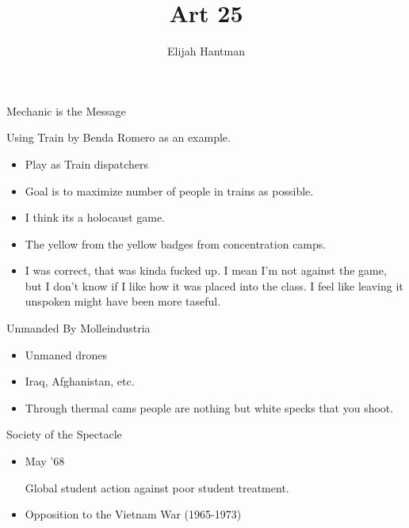 \documentclass{report}
\title{\Huge{Art 25}}
\author{\huge{Elijah Hantman}}
\date{}
\begin{document}
\maketitle
\newpage

\begin{description}
    \item {\large Mechanic is the Message} 
        \begin{mdframed}
            Using Train by Benda Romero
            as an example.
            \begin{itemize}
                \item Play as Train dispatchers
                \item Goal is to maximize number of people
                    in trains as possible.
                \item I think its a holocaust
                    game.
                \item The yellow from the yellow badges
                    from concentration camps.
                \item I was correct, that was kinda 
                    fucked up. I mean I'm not against
                    the game, but I don't know if I like
                    how it was placed into the class. I
                    feel like leaving it unspoken might
                    have been more taseful.
            \end{itemize}
            Unmanded By Molleindustria
            \begin{itemize}
                \item Unmaned drones
                \item Iraq, Afghanistan, etc.
                \item Through thermal cams people are nothing
                    but white specks that you shoot.
            \end{itemize}
        \end{mdframed}
    \item {\large Society of the Spectacle}
        \begin{mdframed}
            \begin{itemize}
                \item May '68
                    \begin{mdframed}
                        Global student action against
                        poor student treatment.
                    \end{mdframed}
                \item Opposition to the Vietnam War (1965-1973)

\end{itemize}
\end{mdframed}
\end{description}
\end{document}
